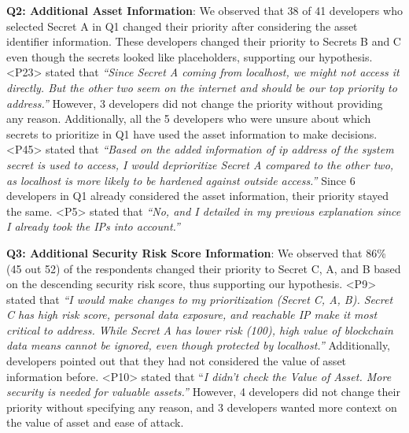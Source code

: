 \textbf{Q2: Additional Asset Information}: We observed that 38 of 41 developers who selected Secret A in Q1 changed their priority after considering the asset identifier information. These developers changed their priority to Secrets B and C even though the secrets looked like placeholders, supporting our hypothesis. <P23> stated that \textit{``Since Secret A coming from localhost, we might not access it directly. But the other two seem on the internet and should be our top priority to address.''} However, 3 developers did not change the priority without providing any reason. Additionally, all the 5 developers who were unsure about which secrets to prioritize in Q1 have used the asset information to make decisions. <P45> stated that \textit{``Based on the added information of ip address of the system secret is used to access, I would deprioritize Secret A compared to the other two, as localhost is more likely to be hardened against outside access.''} Since 6 developers in Q1 already considered the asset information, their priority stayed the same. <P5> stated that \textit{``No, and I detailed in my previous explanation since I already took the IPs into account.''}




\textbf{Q3: Additional Security Risk Score Information}: We observed that 86\% (45 out 52) of the respondents changed their priority to Secret C, A, and B based on the descending security risk score, thus supporting our hypothesis. <P9> stated that \textit{``I would make changes to my prioritization (Secret C, A, B). Secret C has high risk score, personal data exposure, and reachable IP make it most critical to address. While Secret A has lower risk (100), high value of blockchain data means cannot be ignored, even though protected by localhost.''} Additionally, developers pointed out that they had not considered the value of asset information before. <P10> stated that ``\textit{I didn't check the Value of Asset. More security is needed for valuable assets.''} However, 4 developers did not change their priority without specifying any reason, and 3 developers wanted more context on the value of asset and ease of attack. 

